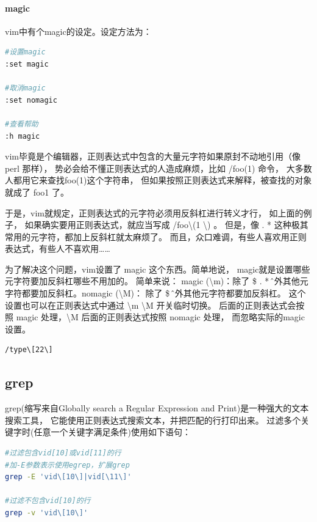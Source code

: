 \documentclass{book}
\begin{document}
\paragraph{magic}vim中有个magic的设定。设定方法为：

\begin{lstlisting}[language=Bash]
#设置magic
:set magic

#取消magic
:set nomagic

#查看帮助
:h magic
\end{lstlisting}

vim毕竟是个编辑器，正则表达式中包含的大量元字符如果原封不动地引用（像perl 那样）， 势必会给不懂正则表达式的人造成麻烦，比如 /foo(1) 命令， 大多数人都用它来查找foo(1)这个字符串， 但如果按照正则表达式来解释，被查找的对象就成了 foo1 了。

于是，vim就规定，正则表达式的元字符必须用反斜杠进行转义才行， 如上面的例子，
如果确实要用正则表达式，就应当写成 /foo\textbackslash (1 \textbackslash) 。 
但是，像 . * 这种极其常用的元字符，都加上反斜杠就太麻烦了。 
而且，众口难调，有些人喜欢用正则表达式，有些人不喜欢用……

为了解决这个问题，vim设置了 magic 这个东西。简单地说， magic就是设置哪些元字符要加反斜杠哪些不用加的。 
简单来说：
magic (\textbackslash m)：除了 \$ . * \^ 之外其他元字符都要加反斜杠。nomagic (\textbackslash M)：
除了 \$ \^ 之外其他元字符都要加反斜杠。
这个设置也可以在正则表达式中通过 \textbackslash m \textbackslash M 开关临时切换。 
\m 后面的正则表达式会按照 magic 处理，\textbackslash M 后面的正则表达式按照 nomagic 处理， 而忽略实际的magic设置。

\begin{lstlisting}[language=Bash]
/type\[22\]
\end{lstlisting}

\subsection{grep}

grep(缩写来自Globally search a Regular Expression and Print)是一种强大的文本搜索工具，
它能使用正则表达式搜索文本，并把匹配的行打印出来。
过滤多个关键字时(任意一个关键字满足条件)使用如下语句：

\begin{lstlisting}[language=Bash]
#过滤包含vid[10]或vid[11]的行
#加-E参数表示使用egrep，扩展grep
grep -E 'vid\[10\]|vid[\11\]'

#过滤不包含vid[10]的行
grep -v 'vid\[10\]'
\end{lstlisting}
\end{document}
